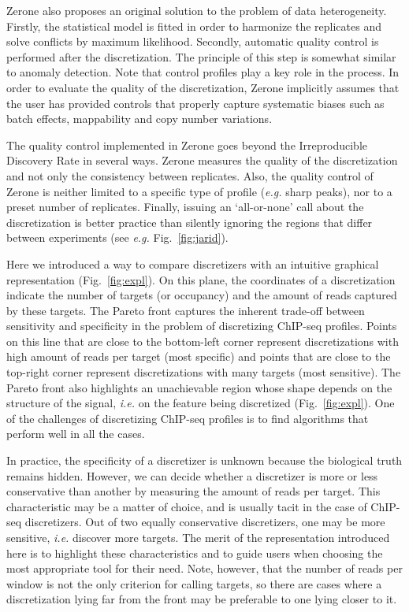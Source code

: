 \documentclass{bioinfo}
\begin{document}
Zerone also proposes an original solution to the problem of
data heterogeneity. Firstly, the statistical model is fitted
in order to harmonize the replicates and solve conflicts by maximum
likelihood. Secondly, automatic quality control is performed
after the discretization. The principle of this step is somewhat
similar to anomaly detection. Note that control profiles play a key
role in the process. In order to evaluate the quality of the
discretization, Zerone implicitly assumes that the user
has provided controls that properly capture systematic biases
such as batch effects, mappability and copy number variations.

The quality control implemented in Zerone goes beyond the
Irreproducible Discovery Rate \citep[IDR,][]{li2011} in several
ways. Zerone measures the quality of the discretization and not only
the consistency between replicates. Also, the quality control of
Zerone is neither
limited to a specific type of profile (\textit{e.g.} sharp peaks),
nor to a preset number of replicates. Finally, issuing an
`all-or-none' call about the discretization is better practice
than silently ignoring the regions that differ between experiments
(see \textit{e.g.} Fig.~\ref{fig:jarid}).

Here we introduced a way to compare discretizers with an intuitive
graphical representation (Fig.~\ref{fig:expl}). On this plane,
the coordinates of a discretization indicate the number of targets
(or occupancy) and the amount of reads captured by these targets.
The Pareto front captures the inherent trade-off between sensitivity
and specificity in the problem of discretizing ChIP-seq profiles.
Points on this line that are close to the bottom-left corner represent
discretizations with high amount of reads per target (most specific)
and points that are close to the top-right corner represent
discretizations with many targets (most sensitive). The Pareto front
also highlights an unachievable region whose shape depends on the
structure of the signal, \textit{i.e.} on the feature being discretized
(Fig.~\ref{fig:expl}). One of the challenges of discretizing ChIP-seq
profiles is to find algorithms that perform well in all the cases.

In practice, the specificity of a discretizer is unknown because
the biological truth remains hidden. However, we can decide whether
a discretizer is more or less conservative than another by measuring
the amount of reads per target. This characteristic may be a matter of
choice, and is usually tacit in the case of ChIP-seq discretizers.
Out of two equally conservative discretizers, one may be more sensitive,
\textit{i.e.} discover more targets. The merit of the representation
introduced here is to highlight these characteristics and to guide users
when choosing the most appropriate tool for their need. Note, however,
that the number of reads per window is not the only criterion for
calling targets, so there are cases where a discretization lying
far from the front may be preferable to one lying closer to it.
\end{document}
